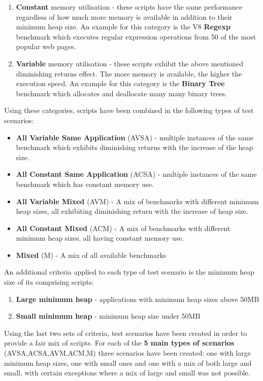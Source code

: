 \documentclass{l4proj}
\begin{document}
\begin{enumerate}
\item \textbf{Constant} memory utilisation - these scripts have the same performance regardless of how much more memory is available in addition to their minimum heap size. An example for this category is the V8 \textbf{Regexp} benchmark which executes regular expression operations from 50 of the most popular web pages.
\item \textbf{Variable} memory utilisation - these scripts exhibit the above mentioned diminishing returns effect. The more memory is available, the higher the execution speed. An example for this category is the \textbf{Binary Tree} benchmark which allocates and deallocate many many binary trees.
\end{enumerate}
Using these categories, scripts have been combined in the following types of test scenarios:
\begin{itemize}
\item \textbf{All Variable Same Application} (AVSA) - multiple instances of the same benchmark which exhibits diminishing returns with the increase of the heap size.
\item \textbf{All Constant Same Application} (ACSA) - multiple instances of the same benchmark which has constant memory use.
\item \textbf{All Variable Mixed} (AVM) - A mix of benchmarks with different minimum heap sizes, all exhibiting diminishing return with the increase of heap size. 
\item \textbf{All Constant Mixed} (ACM) - A mix of benchmarks with different minimum heap sizes, all having constant memory use.
\item \textbf{Mixed} (M) - A mix of all available benchmarks
\end{itemize}
An additional criteria applied to each type of test scenario is the minimum heap size of its comprising scripts:
\begin{enumerate}
\item \textbf{Large minimum heap} - applications with minimum heap sizes above 50MB
\item \textbf{Small minimum heap} - minimum heap size under 50MB
\end{enumerate}
Using the last two sets of criteria, test scenarios have been created in order to provide a fair mix of scripts. For each of the \textbf{5 main types of scenarios} (AVSA,ACSA,AVM,ACM,M) three scenarios have been created: one with large minimum heap sizes, one with small ones and one with a mix of both large and small, with certain exceptions where a mix of large and small was not possible.
\end{document}
